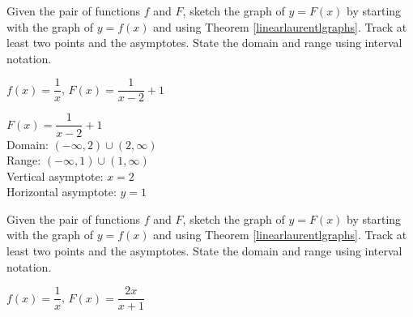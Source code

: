 \documentclass{ximera}
\begin{document}
\begin{problem}\label{rationaltransfirst}
Given the pair of functions $f$ and $F$, sketch the graph of $y=F(x)$ by starting with the graph of $y = f(x)$ and using Theorem \ref{linearlaurentlgraphs}.  Track at least two points and the asymptotes.  State the domain and range using interval notation.

$f(x) = \dfrac{1}{x}$,  $F(x) = \dfrac{1}{x-2}+1$

\begin{solution}
$F(x) = \dfrac{1}{x-2}+1$ \\
Domain: $(-\infty, 2) \cup (2, \infty)$ \\
Range: $(-\infty, 1) \cup (1, \infty)$ \\
Vertical asymptote:  $x = 2$\\
Horizontal asymptote:  $y = 1$ \\

\end{solution}
\end{problem}

\begin{problem}
Given the pair of functions $f$ and $F$, sketch the graph of $y=F(x)$ by starting with the graph of $y = f(x)$ and using Theorem \ref{linearlaurentlgraphs}.  Track at least two points and the asymptotes.  State the domain and range using interval notation.

$f(x) =\dfrac{1}{x}$, $F(x) = \dfrac{2x}{x+1}$
\end{problem}
\end{document}
